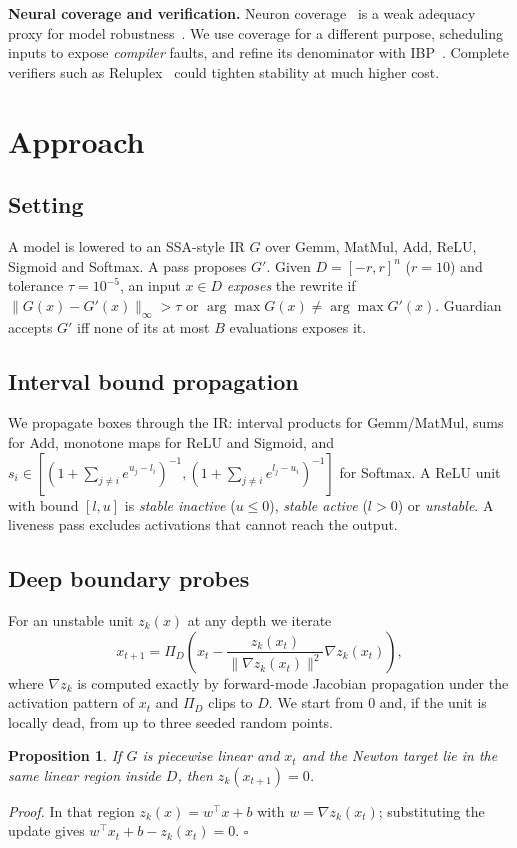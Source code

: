 \documentclass[conference]{IEEEtran}
\newtheorem{proposition}{Proposition}
\begin{document}
\textbf{Neural coverage and verification.} Neuron coverage~\cite{deepxplore,deepgauge} is a weak adequacy proxy for model robustness~\cite{harel}. We use coverage for a different purpose, scheduling inputs to expose \emph{compiler} faults, and refine its denominator with IBP~\cite{ibp}. Complete verifiers such as Reluplex~\cite{reluplex} could tighten stability at much higher cost.

\section{Approach}
\subsection{Setting}
A model is lowered to an SSA-style IR $G$ over Gemm, MatMul, Add, ReLU, Sigmoid and Softmax. A pass proposes $G'$. Given $D=[-r,r]^n$ ($r=10$) and tolerance $\tau=10^{-5}$, an input $x\in D$ \emph{exposes} the rewrite if $\|G(x)-G'(x)\|_\infty>\tau$ or $\arg\max G(x)\neq\arg\max G'(x)$. Guardian accepts $G'$ iff none of its at most $B$ evaluations exposes it.

\subsection{Interval bound propagation}
We propagate boxes through the IR: interval products for Gemm/MatMul, sums for Add, monotone maps for ReLU and Sigmoid, and $s_i\in[(1+\sum_{j\ne i}e^{u_j-l_i})^{-1},(1+\sum_{j\ne i}e^{l_j-u_i})^{-1}]$ for Softmax. A ReLU unit with bound $[l,u]$ is \emph{stable inactive} ($u\le0$), \emph{stable active} ($l>0$) or \emph{unstable}. A liveness pass excludes activations that cannot reach the output.

\subsection{Deep boundary probes}\label{sec:boundary}
For an unstable unit $z_k(x)$ at any depth we iterate
\begin{equation}
x_{t+1}=\Pi_D\!\left(x_t-\frac{z_k(x_t)}{\|\nabla z_k(x_t)\|^2}\nabla z_k(x_t)\right),
\end{equation}
where $\nabla z_k$ is computed exactly by forward-mode Jacobian propagation under the activation pattern of $x_t$ and $\Pi_D$ clips to $D$. We start from $0$ and, if the unit is locally dead, from up to three seeded random points.
\begin{proposition}
If $G$ is piecewise linear and $x_t$ and the Newton target lie in the same linear region inside $D$, then $z_k(x_{t+1})=0$.
\end{proposition}
\noindent\emph{Proof.} In that region $z_k(x)=w^\top x+b$ with $w=\nabla z_k(x_t)$; substituting the update gives $w^\top x_t+b-z_k(x_t)=0$. \hfill$\square$
\end{document}
